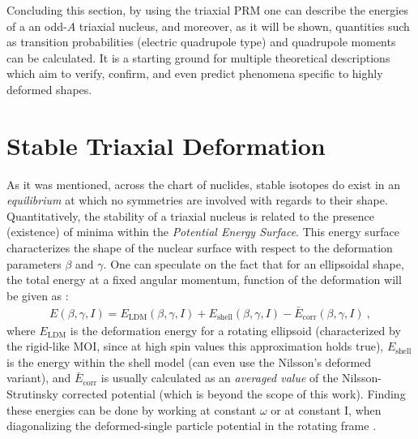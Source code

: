 Concluding this section, by using the triaxial PRM one can describe the energies of a an odd-$A$ triaxial nucleus, and moreover, as it will be shown, quantities such as transition probabilities (electric quadrupole type) and quadrupole moments can be calculated. It is a starting ground for multiple theoretical descriptions which aim to verify, confirm, and even predict phenomena specific to highly deformed shapes.

\section{Stable Triaxial Deformation}

As it was mentioned, across the chart of nuclides, stable isotopes do exist in an \emph{equilibrium} at which no symmetries are involved with regards to their shape. Quantitatively, the stability of a triaxial nucleus is related to the presence (existence) of minima within the \emph{Potential Energy Surface}. This energy surface characterizes the shape of the nuclear surface with respect to the deformation parameters $\beta$ and $\gamma$. One can speculate on the fact that for an ellipsoidal shape, the total energy at a fixed angular momentum, function of the deformation will be given as \cite{ring2004nuclear}:
\begin{align}
    E(\beta,\gamma,I)=E_\text{LDM}(\beta,\gamma,I)+E_\text{shell}(\beta,\gamma,I)-\bar{E}_\text{corr}(\beta,\gamma,I)\ ,
    \label{energy-surface-correction-terms}
\end{align}
where $E_\text{LDM}$ is the deformation energy for a rotating ellipsoid (characterized by the rigid-like MOI, since at high spin values this approximation holds true), $E_\text{shell}$ is the energy within the shell model (can even use the Nilsson's deformed variant), and $\bar{E}_\text{corr}$ is usually calculated as an \emph{averaged value} of the Nilsson-Strutinsky corrected potential \cite{brack1972funny} (which is beyond the scope of this work). Finding these energies can be done by working at constant $\omega$ or at constant I, when diagonalizing the deformed-single particle potential in the rotating frame \cite{ring2004nuclear}.

